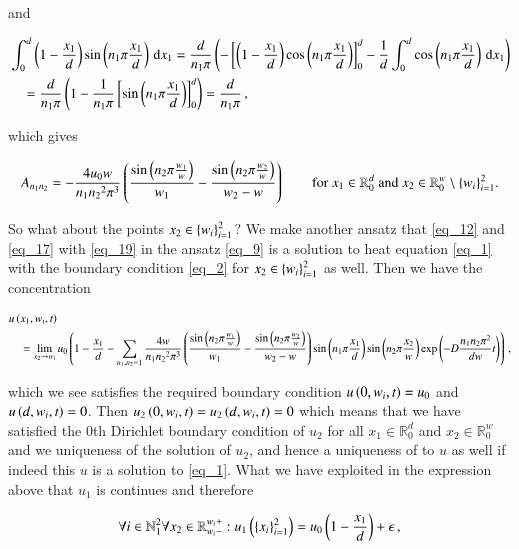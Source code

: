 \documentclass[11pt,english,a4paper]{article}
\begin{document}
\begin{flushleft}
and

\begin{align*}
&\int_{0}^{d}\left({1-\frac{x_1}{d}}\right)\sin\left({n_1\pi\frac{x_1}{d}}\right)\,\mathrm{d}x_1 = \frac{d}{n_1\pi}\left({-\left[{\left({1-\frac{x_1}{d}}\right)\cos\left({n_1\pi\frac{x_1}{d}}\right)}\right]_0^d - \frac{1}{d}\int_{0}^{d}\cos\left({n_1\pi\frac{x_1}{d}}\right)\,\mathrm{d}x_1}\right)
\\
&\quad = \frac{d}{n_1\pi}\left({1 - \frac{1}{n_1 \pi}\left[{\sin\left({n_1\pi\frac{x_1}{d}}\right)}\right]_0^d}\right) = \frac{d}{n_1 \pi}\,,
\end{align*}

which gives

\begin{align}
A_{n_1 n_2} = -\frac{4 u_0 w}{n_1 {n_2}^2 \pi^3}\left({\frac{\sin\left({n_2 \pi \frac{w_1}{w}}\right)}{w_1}-\frac{\sin\left({n_2 \pi \frac{w_2}{w}}\right)}{w_2-w}}\right) \qquad \text{for $x_1\in\mathbb{R}_0^d$ and $x_2\in\mathbb{R}_0^w \setminus \left\lbrace{w_i}\right\rbrace_{i=1}^2$.}
\label{eq_19}
\end{align}

So what about the points $x_2\in\left\lbrace{w_i}\right\rbrace_{i=1}^2$? We make another ansatz that \eqref{eq_12} and \eqref{eq_17} with \eqref{eq_19} in the ansatz \eqref{eq_9} is a solution to heat equation \eqref{eq_1} with the boundary condition \eqref{eq_2} for $x_2\in\left\lbrace{w_i}\right\rbrace_{i=1}^2$ as well. Then we have the concentration

\begin{align}
&u\left({x_1,w_i,t}\right) 
\label{eq_20}\\
&\quad = \lim_{x_2\to w_i}u_0\left({1-\frac{x_1}{d} - \sum_{n_1,n_2=1} \frac{4 w}{n_1 {n_2}^2 \pi^3}\left({\frac{\sin\left({n_2 \pi \frac{w_1}{w}}\right)}{w_1}-\frac{\sin\left({n_2 \pi \frac{w_2}{w}}\right)}{w_2-w}}\right)\sin\left({n_1\pi \frac{x_1}{d}}\right) \sin\left({n_2\pi \frac{x_2}{w}}\right) \exp\left({-D\frac{n_1 n_2 \pi^2}{dw} t}\right)}\right)\,,
\nonumber
\end{align}

which we see satisfies the required boundary condition $u\left({0,w_i,t}\right) = u_0$ and $u\left({d,w_i,t}\right)=0$. Then  $u_2\left({0,w_i,t}\right)=u_2\left({d,w_i,t}\right)=0$ which means that we have satisfied the 0th Dirichlet boundary condition of $u_2$ for all $x_1\in\mathbb{R}_0^d$ and $x_2\in\mathbb{R}_0^w$ and we uniqueness of the solution of $u_2$, and hence a uniqueness of to $u$ as well if indeed this $u$ is a solution to \eqref{eq_1}. What we have exploited in the expression above that $u_1$ is continues and therefore 

\begin{align*}
\forall i \in \mathbb{N}_1^2 \forall x_2\in\mathbb{R}_{w_i-}^{w_i +} : u_1\left({\left\lbrace{x_i}\right\rbrace_{i=1}^2}\right) = u_0\left({1-\frac{x_1}{d}}\right) + \epsilon\,,
\end{align*}


\end{flushleft}
\end{document}

